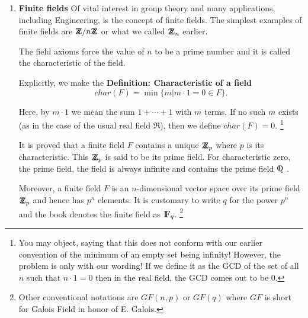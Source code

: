 \documentclass[12pt]{article}
\newcommand{\deff}[1]{{\bf Definition: #1} }
\def\nexto{\kern -0.54em}
\def\DF{ \mbox{\rm {I\ \nexto F}} }
\def\DZ{ \mbox{\rm Z \kern -0.75em Z} }
\def\DQ{ \mbox{\rm\hbox{Q \kern-0.85em\raise0.25ex
    	\hbox{\vrule height5.4pt width0.7pt} \kern0.45em}} }
\begin{document}
\begin{enumerate}
It is evident that all elementary matrices are in $SL_n(F)$ and it is an
important theorem that they generate $SL_n(F)$ in the sense that every
element of $SL_n(F)$ is a product of elementary matrices!
\footnote{At higher level of group theory, we may replace the field $F$ by a
commutative ring and investigate corresponding theorems, which lead to
very important and interesting concepts!}

\item{\bf Finite fields}
Of vital interest in group theory and many applications, including
Engineering, is the concept of finite fields. The simplest examples of
finite fields are $\DZ/n\DZ$ or what we called $\DZ_n$ earlier.

The field axioms force the value of $n$ to be a prime number and it is
called the characteristic of the field.

Explicitly, we make the \deff{Characteristic of a
field}
$$char(F) = \min\{m | m\cdot 1 =0 \in F\}.$$

Here, by $m\cdot 1$ we mean the sum $1+\cdots+1$ with $m$ terms.
If no such $m$ exists (as in the case of the usual real field $\Re$),
then we define $char(F)=0$.
\footnote{You may object, saying that this does not conform with our
earlier convention of the minimum of an empty set being infinity!
 However, the problem is only with our wording! If we
define it as the GCD of the set of all $n$ such that $n\cdot 1=0$ then
in the real field, the GCD comes out to be $0$.}

It is proved that a finite field $F$ contains a unique $\DZ_p$ where $p$ is
its characteristic. This $\DZ_p$ is said to be its prime field.
For characteristic zero, the prime field, the field is always infinite
and contains the prime field $\DQ$.

Moreover, a finite field $F$  is an $n$-dimensional vector space over
its prime field $\DZ_p$ and hence has $p^n$ elements.
It is customary to write $q$ for the power $p^n$ and the book denotes the
finite field as $\DF_q$. 
\footnote{Other conventional notations are $GF(n,p)$ or
$GF(q)$ where $GF$ is short for Galois Field in honor of E. Galois.}

\end{enumerate}
\end{document}
